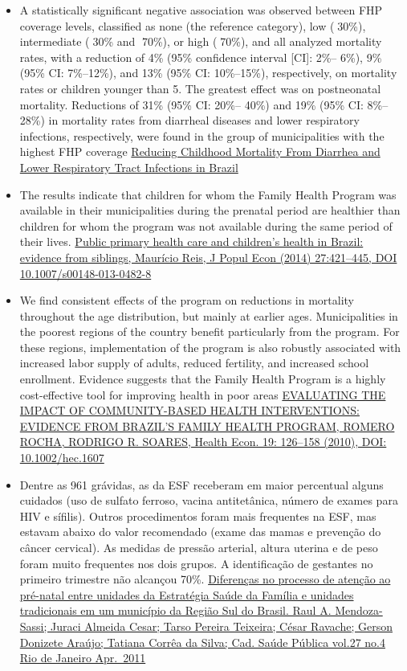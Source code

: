 \documentclass[]{book}
\begin{document}
\begin{itemize}
\item
  A statistically significant negative association was observed between FHP coverage levels, classified as none (the reference category), low (30\%), intermediate (30\% and 70\%), or high (70\%), and all analyzed mortality rates, with a reduction of 4\% (95\% confidence interval {[}CI{]}: 2\%-- 6\%), 9\% (95\% CI: 7\%--12\%), and 13\% (95\% CI: 10\%--15\%), respectively, on mortality rates or children younger than 5. The greatest effect was on postneonatal mortality. Reductions of 31\% (95\% CI: 20\%-- 40\%) and 19\% (95\% CI: 8\%--28\%) in mortality rates from diarrheal diseases and lower respiratory infections, respectively, were found in the group of municipalities with the highest FHP coverage \href{https://sci-hub.tw/10.1542/peds.2009-3197}{Reducing Childhood Mortality From Diarrhea and Lower Respiratory Tract Infections in Brazil}
\item
  The results indicate that children for whom the Family Health Program was available in their municipalities during the prenatal period are healthier than children for whom the program was not available during the same period of their lives. \href{https://sci-hub.tw/10.1007/s00148-013-0482-8}{Public primary health care and children's health in Brazil: evidence from siblings, Maurício Reis, J Popul Econ (2014) 27:421--445, DOI 10.1007/s00148-013-0482-8}
\item
  We find consistent effects of the program on reductions in mortality throughout the age distribution, but mainly at earlier ages. Municipalities in the poorest regions of the country benefit particularly from the program. For these regions, implementation of the program is also robustly associated with increased labor supply of adults, reduced fertility, and increased school enrollment. Evidence suggests that the Family Health Program is a highly cost-effective tool for improving health in poor areas \href{https://sci-hub.tw/10.1002/hec.1607}{EVALUATING THE IMPACT OF COMMUNITY-BASED HEALTH INTERVENTIONS: EVIDENCE FROM BRAZIL'S FAMILY HEALTH PROGRAM, ROMERO ROCHA, RODRIGO R. SOARES, Health Econ. 19: 126--158 (2010), DOI: 10.1002/hec.1607}
\item
  Dentre as 961 grávidas, as da ESF receberam em maior percentual alguns cuidados (uso de sulfato ferroso, vacina antitetânica, número de exames para HIV e sífilis). Outros procedimentos foram mais frequentes na ESF, mas estavam abaixo do valor recomendado (exame das mamas e prevenção do câncer cervical). As medidas de pressão arterial, altura uterina e de peso foram muito frequentes nos dois grupos. A identificação de gestantes no primeiro trimestre não alcançou 70\%. \href{http://www.scielo.br/scielo.php?script=sci_arttext\&pid=S0102-311X2011000400018}{Diferenças no processo de atenção ao pré-natal entre unidades da Estratégia Saúde da Família e unidades tradicionais em um município da Região Sul do Brasil. Raul A. Mendoza-Sassi; Juraci Almeida Cesar; Tarso Pereira Teixeira; César Ravache; Gerson Donizete Araújo; Tatiana Corrêa da Silva; Cad. Saúde Pública vol.27 no.4 Rio de Janeiro Apr.~2011}

\end{itemize}
\end{document}
